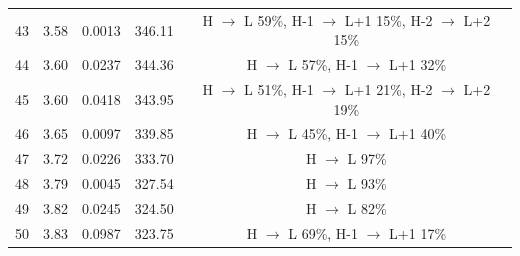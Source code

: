 \begin{table}[H]
{\begin{center}
\begin{tabular}{ccccc}
43 & 3.58 & 0.0013 & 346.11 & H $\rightarrow$ L 59\%, H-1 $\rightarrow$ L+1 15\%, H-2 $\rightarrow$ L+2 15\% \\
44 & 3.60 & 0.0237 & 344.36 & H $\rightarrow$ L 57\%, H-1 $\rightarrow$ L+1 32\% \\
45 & 3.60 & 0.0418 & 343.95 & H $\rightarrow$ L 51\%, H-1 $\rightarrow$ L+1 21\%, H-2 $\rightarrow$ L+2 19\% \\
46 & 3.65 & 0.0097 & 339.85 & H $\rightarrow$ L 45\%, H-1 $\rightarrow$ L+1 40\% \\
47 & 3.72 & 0.0226 & 333.70 & H $\rightarrow$ L 97\% \\
48 & 3.79 & 0.0045 & 327.54 & H $\rightarrow$ L 93\% \\
49 & 3.82 & 0.0245 & 324.50 & H $\rightarrow$ L 82\% \\
50 & 3.83 & 0.0987 & 323.75 & H $\rightarrow$ L 69\%, H-1 $\rightarrow$ L+1 17\% \\
\hline
\end{tabular}
\end{center} }
\vspace{-0.2cm}
\end{table} \newpage \noindent

